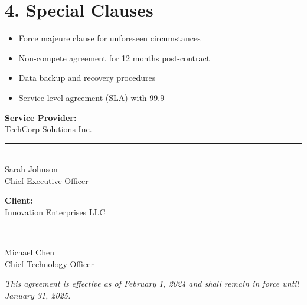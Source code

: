 \documentclass[a4paper,11pt]{article}
\begin{document}
\vspace{0.5cm}


\section{4. Special Clauses}
 
\begin{itemize}
    
    \item Force majeure clause for unforeseen circumstances
    
    \item Non-compete agreement for 12 months post-contract
    
    \item Data backup and recovery procedures
    
    \item Service level agreement (SLA) with 99.9%
    
\end{itemize} 


\vspace{1cm}

\begin{minipage}[t]{0.45\textwidth}
\textbf{Service Provider:}\\
TechCorp Solutions Inc.

\vspace{2cm}

\rule{6cm}{0.5pt}\\
Sarah Johnson\\
Chief Executive Officer
\end{minipage}
\hfill
\begin{minipage}[t]{0.45\textwidth}
\textbf{Client:}\\
Innovation Enterprises LLC

\vspace{2cm}

\rule{6cm}{0.5pt}\\
Michael Chen\\
Chief Technology Officer
\end{minipage}

\vspace{1cm}

\begin{center}
\textit{This agreement is effective as of February 1, 2024 and shall remain in force until January 31, 2025.}
\end{center}
\end{document}
